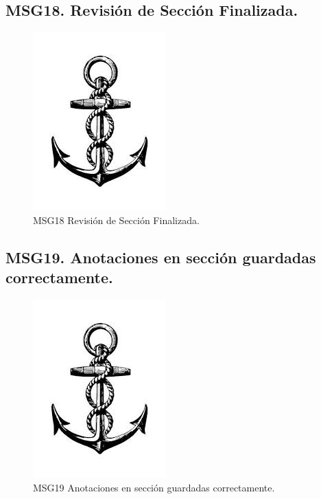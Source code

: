 \subsection{MSG18. Revisión de Sección Finalizada.}
    \begin{figure}[htbp]
        \begin{center}
            \includegraphics[width=.4\textwidth]{images/MSG/ancla}
            \caption{MSG18 Revisión de Sección Finalizada.}
            \label{fig:MSG18}
        \end{center}
    \end{figure}

\subsection{MSG19. Anotaciones en sección guardadas correctamente.}
    \begin{figure}[htbp]
        \begin{center}
            \includegraphics[width=.4\textwidth]{images/MSG/ancla}
            \caption{MSG19 Anotaciones en sección guardadas correctamente.}
            \label{fig:MSG19}
        \end{center}
    \end{figure}

